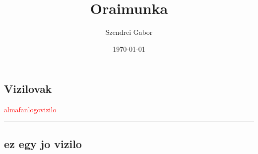 \documentclass{book}
\begin{document}

\title{Oraimunka}
\author{Szendrei Gabor}
\date{\today}
\maketitle

\begin{flushleft}
    \section{Vizilovak}
    \textcolor{red}{almafanlogovizilo}
    \noindent
    \rule{\linewidth}{0.5mm}
    \subsection{ez egy jo vizilo}
\end{flushleft}
\end{document}
